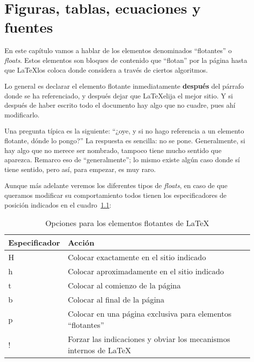 \chapter{Figuras, tablas, ecuaciones y fuentes}

En este capítulo vamos a hablar de los elementos denominados ``flotantes'' o \textit{floats}. Estos elementos son bloques de contenido que ``flotan'' por la página hasta que \LaTeX\space los coloca donde considera a través de ciertos algoritmos.

Lo general es declarar el elemento flotante inmediatamente \textbf{después} del párrafo donde se ha referenciado, y después dejar que \LaTeX\space elija el mejor sitio. Y si después de haber escrito todo el documento hay algo que no cuadre, pues ahí modificarlo.

Una pregunta típica es la siguiente: ``¿oye, y si no hago referencia a un elemento flotante, dónde lo pongo?'' La respuesta es sencilla: no se pone. Generalmente, si hay algo que no merece ser nombrado, tampoco tiene mucho sentido que aparezca. Remarco eso de ``generalmente''; lo mismo existe algún caso donde sí tiene sentido, pero así, para empezar, es muy raro.

Aunque más adelante veremos los diferentes tipos de \textit{floats}, en caso de que queramos modificar su comportamiento todos tienen los especificadores de posición indicados en el cuadro~\ref{tab:floats-options}:

\begin{table}
    \caption{\label{tab:floats-options}Opciones para los elementos flotantes de \LaTeX}
    \centering
    \begin{tabular}{@{}ll@{}}
        \toprule
        \textbf{Especificador} & \textbf{Acción} \\
        \midrule
        H & Colocar exactamente en el sitio indicado                           \\
        h & Colocar aproximadamente en el sitio indicado                       \\
        t & Colocar al comienzo de la página                                   \\
        b & Colocar al final de la página                                      \\
        p & Colocar en una página exclusiva para elementos ``flotantes''       \\
        ! & Forzar las indicaciones y obviar los mecanismos internos de \LaTeX \\
    \bottomrule
    \end{tabular}
\end{table}

